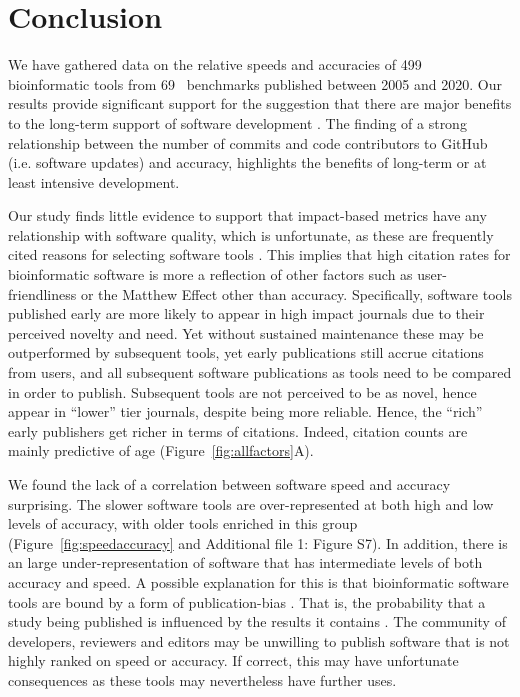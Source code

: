 \documentclass{bmcart}
\def\numTools{499}
\def\numBenchmarkPubs{69}
\begin{document}
\section*{Conclusion}

We have gathered data on the relative speeds and accuracies of
\numTools~ bioinformatic tools from
\numBenchmarkPubs~ benchmarks published between
2005 and 2020. Our results provide significant support for the suggestion that there are major benefits to
the long-term support of software development \cite{siepel2019challenges}.
The
finding of a strong relationship between the number of commits and code contributors to
GitHub (i.e. software updates) and accuracy, highlights the benefits of
long-term or at least intensive development.

Our study finds little evidence to support that impact-based metrics
have any relationship with software quality, which is unfortunate, as these
are frequently cited reasons for selecting software tools
\cite{Loman2015-bw}. This implies that high citation
rates for bioinformatic software
\cite{Perez-Iratxeta2007-lv,Van_Noorden2014-kc,Wren2016-xy} is more a
reflection of other factors such as user-friendliness or the Matthew Effect
\cite{Lariviere2010-kx,Merton1968-cb} other than accuracy.
     {\color{black} Specifically, software tools published early are
       more likely to appear in high impact journals due to their
       perceived novelty and need. Yet without sustained maintenance
       these may be outperformed by subsequent tools, yet early
       publications still accrue citations from users, and all
       subsequent software publications as tools need to be compared
       in order to publish. Subsequent tools are not perceived to be
       as novel, hence appear in ``lower'' tier journals, despite
       being more reliable. Hence, the ``rich'' early publishers get
       richer in terms of citations. Indeed, citation counts are
       mainly predictive of age (Figure~\ref{fig:allfactors}A).}

We found the lack of a correlation between software speed and accuracy
surprising.  The slower software tools are over-represented at both
high and low levels of accuracy{\color{black}, with older tools enriched in this group} (Figure~\ref{fig:speedaccuracy} {\color{black}and Additional file 1: Figure S7}).
In addition, there is an large under-representation of software that has
intermediate levels of both accuracy and speed. A possible explanation
for this is that bioinformatic software tools are bound by a form of
publication-bias \cite{Boulesteix2015-am,Nissen:2016}. That is, the
probability that a study being published is influenced by the results
it contains \cite{sterling1995publication}. The community of
developers, reviewers and editors may be unwilling to publish software
that is not highly ranked on speed or accuracy. If correct, this may
have unfortunate consequences as these tools may {\color{black}nevertheless} have further uses.
\end{document}
